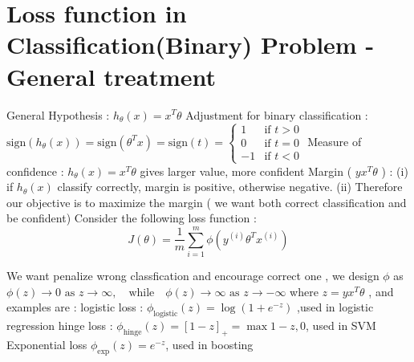 \documentclass{article}
\begin{document}
\section{Loss function in Classification(Binary) Problem - General treatment}
General Hypothesis : \(h_\theta(x) = x^T \theta\)
\newline
\newline
Adjustment for binary classification : 
\newline
\(
\text{sign}(h_\theta(x)) = \text{sign}(\theta^T x)= \text{sign}(t) = 
\begin{cases} 
1 & \text{if } t > 0 \\
0 & \text{if } t = 0 \\
-1 & \text{if } t < 0 
\end{cases}
\)
\newline
\newline
Measure of confidence :  \(h_\theta(x) = x^T \theta\) gives larger value, more confident  
\newline
\newline
Margin ( \(y x^T \theta\) ) : (i) if \(h_\theta(x)\) classify correctly, margin is positive, otherwise negative.
\newline
(ii) Therefore our objective is to maximize the margin ( we want both correct classification and be confident)
\newline
\newline
Consider the following loss function : 
\[
J(\theta) = \frac{1}{m} \sum_{i=1}^{m} \phi\left(y^{(i)} \theta^T x^{(i)}\right)
\]

We want penalize wrong classfication and encourage correct one , we design \(\phi\) as 
\(
\phi(z) \to 0 \text{ as } z \to \infty, \quad \text{while} \quad \phi(z) \to \infty \text{ as } z \to -\infty
\)  where  \(z = yx^{T}\theta\) , and examples are :  
\newline 
\newline
logistic loss : \(\phi_{\text{logistic}}(z) = \log(1 + e^{-z})\) ,used in logistic regression 
\newline 
\newline 
hinge loss : \(\phi_{\text{hinge}}(z) = [1 - z]_+ = \max{1 - z, 0}\), used in SVM
\newline 
\newline 
Exponential loss \(\phi_{\text{exp}}(z) = e^{-z}\), used in boosting 
\end{document}

